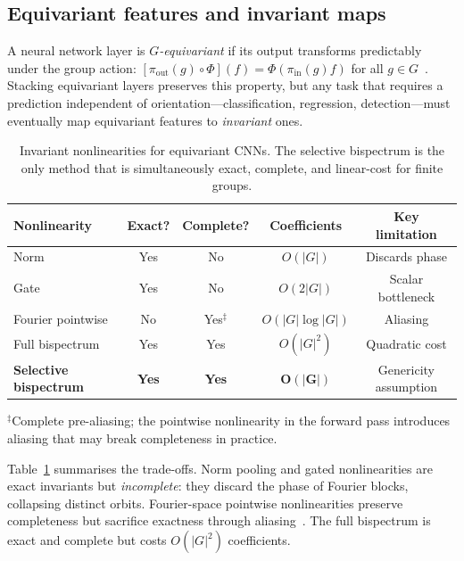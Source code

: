\documentclass{article}
\theoremstyle{definition}
\theoremstyle{remark}
\theoremstyle{definition}
\begin{document}
\subsection{Equivariant features and invariant maps}

A neural network layer is \emph{$G$-equivariant} if its output transforms
predictably under the group action:
$[\pi_{\mathrm{out}}(g) \circ \Phi](f) = \Phi(\pi_{\mathrm{in}}(g) f)$
for all $g \in G$~\citep{cohen2016group, weiler2019general}.
Stacking equivariant layers preserves this property, but any task that requires
a prediction independent of orientation---classification, regression,
detection---must eventually map equivariant features to \emph{invariant} ones.

\begin{table}[t]
  \caption{Invariant nonlinearities for equivariant CNNs. The selective
    bispectrum is the only method that is simultaneously exact, complete,
    and linear-cost for finite groups.}
  \label{tab:nonlinearity-comparison}
  \centering
  \small
  \begin{tabular}{lcccc}
    \toprule
    Nonlinearity & Exact? & Complete? & Coefficients & Key limitation \\
    \midrule
    Norm          & Yes & No  & $O(|G|)$      & Discards phase \\
    Gate          & Yes & No  & $O(2|G|)$     & Scalar bottleneck \\
    Fourier pointwise & No & Yes$^\ddagger$ & $O(|G| \log |G|)$ & Aliasing \\
    Full bispectrum & Yes & Yes & $O(|G|^2)$  & Quadratic cost \\
    \midrule
    \textbf{Selective bispectrum} & \textbf{Yes} & \textbf{Yes}
      & $\mathbf{O(|G|)}$ & Genericity assumption \\
    \bottomrule
  \end{tabular}

  \vspace{0.3em}
  {\small $^\ddagger$Complete pre-aliasing; the pointwise nonlinearity in the forward pass introduces aliasing that may break completeness in practice.}
\end{table}

Table~\ref{tab:nonlinearity-comparison} summarises the trade-offs. Norm
pooling and gated nonlinearities are exact invariants but \emph{incomplete}:
they discard the phase of Fourier blocks, collapsing distinct orbits.
Fourier-space pointwise nonlinearities preserve completeness but
sacrifice exactness through aliasing~\citep{weiler2019general}. The full
bispectrum is exact and complete but costs $O(|G|^2)$ coefficients.
\end{document}
